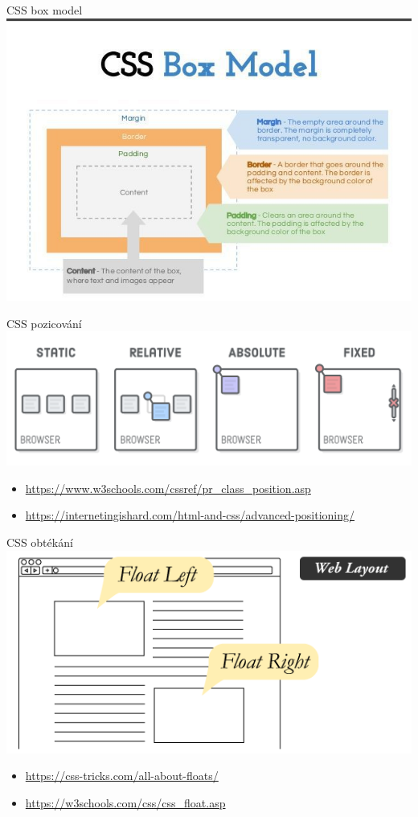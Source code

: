 \documentclass{beamer}
\begin{document}
\begin{frame}{CSS box model}
  \includegraphics[scale=0.5]{css-box-model}
\end{frame}


\begin{frame}{CSS pozicování}
	  \includegraphics[scale=0.26]{css-positioning}
	\begin{itemize}
		\item \url{https://www.w3schools.com/cssref/pr_class_position.asp}
		\item \url{https://internetingishard.com/html-and-css/advanced-positioning/}
	\end{itemize}
\end{frame}

\begin{frame}{CSS obtékání}
	  \includegraphics[scale=0.5]{css-floating}
	\begin{itemize}
		\item \url{https://css-tricks.com/all-about-floats/}
		\item \url{https://w3schools.com/css/css_float.asp}
	\end{itemize}
\end{frame}
\end{document}
